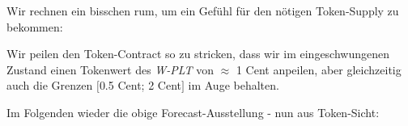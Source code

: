 \vspace{0.5cm}

Wir rechnen ein bisschen rum, um ein Gefühl für den nötigen Token-Supply zu bekommen:

\vspace{0.3cm}

\begin{Example}

Wir peilen den Token-Contract so zu stricken, dass wir im eingeschwungenen Zustand einen Tokenwert des \textit{W-PLT} von $\approx$ 1 Cent anpeilen, aber gleichzeitig auch die Grenzen $[$0.5 Cent; 2 Cent$]$ im Auge behalten.

\vspace{0.2cm}

Im Folgenden wieder die obige Forecast-Ausstellung - nun aus Token-Sicht:



\end{Example}

